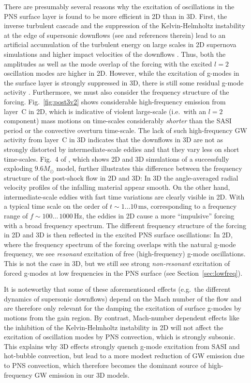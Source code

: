 There are presumably several reasons why the excitation of
oscillations in the PNS surface layer is found to be more efficient
in 2D than in 3D.  First, the
inverse turbulent cascade \citep{kraichnan_76} and the suppression of
the Kelvin-Helmholtz instability at the edge of supersonic downflows
(see \citealt{mueller_15b} and references therein) lead to an
artificial accumulation of the turbulent energy on large scales in 2D
supernova simulations \citep{hanke_12,abdikamalov_15} and higher
impact velocities of the downflows
\citep{melson_15a,mueller_15b}.  Thus, both the amplitudes as well as
the mode overlap of the forcing with the excited $l=2$ oscillation
modes are higher in 2D.  However, while the
excitation of g-modes in the surface layer is strongly suppressed in
3D, there is still some residual g-mode activity
\citep{melson_15a,mueller_15b}.  {Furthermore,} we must also
consider the frequency structure of the forcing.
Fig.~\ref{fig:post3v2} shows considerable high-frequency emission from
layer~C in 2D, which is indicative of violent large-scale (i.e.\ with
an $l=2$ component) mass motions on time-scales considerably
\emph{shorter} than the SASI period or the convective overturn
time-scale. The lack of such high-frequency GW activity from layer~C
in 3D indicates that the downflows in 3D are not as strongly distorted
by intermediate-scale eddies and that they vary less on short
time-scales.  Fig.~4 of \citet{melson_15a}, which shows 2D and 3D
simulations of a successfully exploding $9.6 M_\odot$ model, further
illustrates this difference between the frequency structure of the
post-shock flow in 2D and 3D: In 3D the angle-averaged radial velocity
profiles of the infalling material appear smooth. On the other hand,
intermediate-scale eddies with fast time variations are clearly
visible in 2D.  With a typical time scale on the order of $t \sim
1\ldots 10 \, \mathrm{ms}$, corresponding to a frequency range of $f
\sim 100 \ldots \,1000 \, \mathrm{Hz}$, the eddies in 2D cause a more
``impulsive'' forcing with a broad frequency spectrum.  The different
frequency structure of the forcing in 2D and 3D is then reflected in
the excited PNS surface oscillations: In 2D, where the frequency
spectrum of the forcing overlaps with the natural g-mode frequency, we
see \emph{resonant} excitation of free (high-frequency) g-mode
oscillations.  This is not the case in 3D, but we still see strong
\emph{non-resonant} excitation of forced g-modes at low frequencies in
the PNS surface (see Section~\ref{sec:lowfreq}). 

It is noteworthy that some of these aforementioned effects
(e.g.\ the different dynamics of supersonic downflows) depend on the Mach number
of the flow and are therefore
only relevant for the damping the excitation of surface g-modes by motions from
the gain region. By contrast, Mach-number dependent effects
like the inhibition of the Kelvin-Helmholtz instability in 2D
will not affect the excitation of oscillation modes by PNS convection,
which is strongly subsonic. This explains why 3D effects
strongly quench g-mode excitation from SASI and
hot-bubble convection, but lead to a more
modest reduction of GW emission due to PNS convection, which
therefore becomes the dominant source of high-frequency GW emission in
our 3D models.

